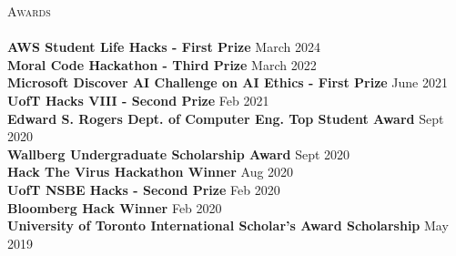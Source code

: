 \documentclass[a4paper]{article}
\newcommand{\lineunder} {
    \vspace*{-8pt} \\
    \hspace*{-18pt} \hrulefill \\
}
\newcommand{\header} [1] {
    {\hspace*{-18pt}\vspace*{6pt} \textsc{#1}}
    \vspace*{-6pt} \lineunder
}
\begin{document}
\header{Awards}
\textbf{AWS Student Life Hacks - First Prize} \hfill March 2024\\
\vspace*{2mm}
\textbf{Moral Code Hackathon - Third Prize} \hfill March 2022\\
\vspace*{2mm}
\textbf{Microsoft Discover AI Challenge on AI Ethics - First Prize} \hfill June 2021\\
\vspace*{2mm}
\textbf{UofT Hacks VIII - Second Prize} \hfill Feb 2021\\
\vspace*{2mm}
\textbf{Edward S. Rogers Dept. of Computer Eng. Top Student Award} \hfill Sept 2020\\
\vspace*{2mm}
\textbf{Wallberg Undergraduate Scholarship Award} \hfill Sept 2020\\
\vspace*{2mm}
\textbf{Hack The Virus Hackathon Winner} \hfill Aug 2020\\
\vspace*{2mm}
\textbf{UofT NSBE Hacks - Second Prize} \hfill Feb 2020\\
\vspace*{2mm}
\textbf{Bloomberg Hack Winner} \hfill Feb 2020\\
\vspace*{2mm}
\textbf{University of Toronto International Scholar’s Award Scholarship} \hfill May 2019\\
\end{document}
